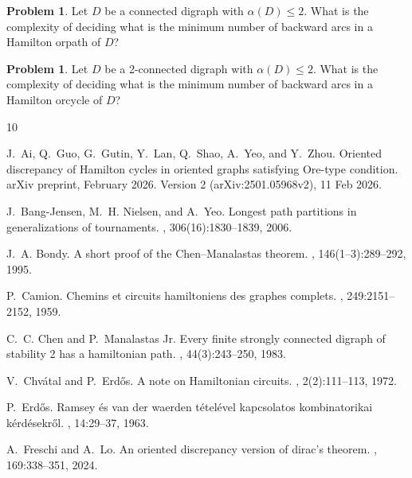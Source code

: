 \documentclass{article}
\newcommand{\2}{\vspace{2mm}}
\theoremstyle{definition}
\newtheorem{problem}[theorem]{Problem}
\begin{document}
\begin{problem}
Let $D$ be a connected digraph with $\alpha(D)\le 2$. What is the complexity of deciding what is the minimum number of backward arcs in a Hamilton orpath of $D$? 
\end{problem}

\begin{problem}
Let $D$ be a 2-connected digraph with $\alpha(D)\le 2$. What is the complexity of deciding what is the minimum number of backward arcs in a Hamilton orcycle of $D$? 
\end{problem}




\begin{thebibliography}{10}

J.~Ai, Q.~Guo, G.~Gutin, Y.~Lan, Q.~Shao, A.~Yeo, and Y.~Zhou.
\newblock Oriented discrepancy of {H}amilton cycles in oriented graphs
  satisfying {O}re-type condition.
\newblock arXiv preprint, February 2026.
\newblock Version 2 (arXiv:2501.05968v2), 11 Feb 2026.

J.~Bang-Jensen, M.~H. Nielsen, and A.~Yeo.
\newblock Longest path partitions in generalizations of tournaments.
, 306(16):1830--1839, 2006.

J.~A. Bondy.
\newblock A short proof of the {Chen--Manalastas} theorem.
, 146(1--3):289--292, 1995.

P.~Camion.
\newblock Chemins et circuits hamiltoniens des graphes complets.
, 249:2151--2152, 1959.

C.~C. Chen and P.~Manalastas Jr.
\newblock Every finite strongly connected digraph of stability 2 has a
  hamiltonian path.
, 44(3):243--250, 1983.

V.~Chv{\'a}tal and P.~Erd{\H{o}}s.
\newblock A note on {H}amiltonian circuits.
, 2(2):111--113, 1972.

P.~Erd{\H{o}}s.
\newblock Ramsey {\'e}s van der waerden t{\'e}tel{\'e}vel kapcsolatos
  kombinatorikai k{\'e}rd{\'e}sekr{\H{o}}l.
, 14:29--37, 1963.

A.~Freschi and A.~Lo.
\newblock An oriented discrepancy version of dirac's theorem.
, 169:338--351, 2024.


\end{thebibliography}
\end{document}
